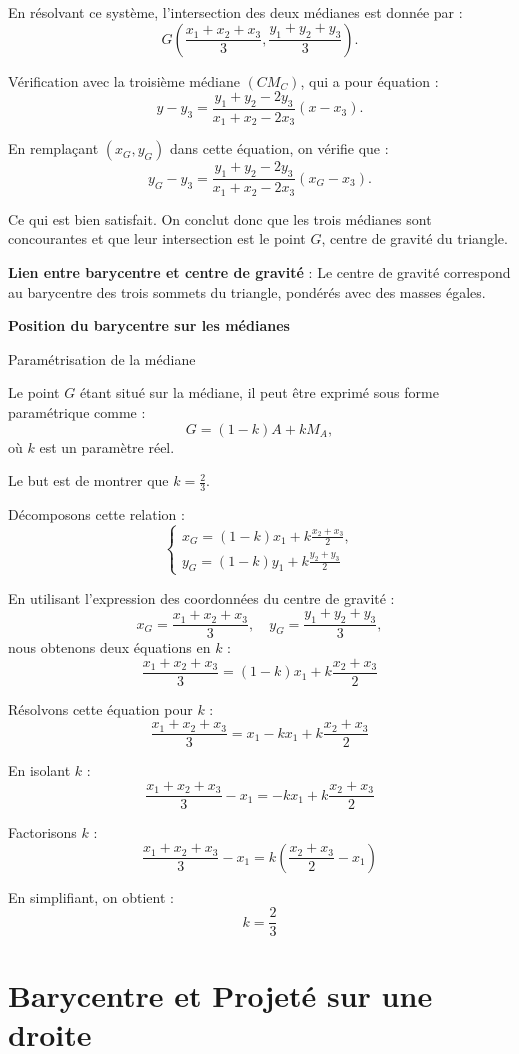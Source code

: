 \documentclass[10pt,a4paper]{article}
\begin{document}
En résolvant ce système, l'intersection des deux médianes est donnée par :
\[
G \left( \frac{x_1 + x_2 + x_3}{3}, \frac{y_1 + y_2 + y_3}{3} \right).
\]

Vérification avec la troisième médiane \((CM_C)\), qui a pour équation :
\[
y - y_3 = \frac{y_1 + y_2 - 2y_3}{x_1 + x_2 - 2x_3} (x - x_3).
\]

En remplaçant \((x_G, y_G)\) dans cette équation, on vérifie que :
\[
y_G - y_3 = \frac{y_1 + y_2 - 2y_3}{x_1 + x_2 - 2x_3} (x_G - x_3).
\]

Ce qui est bien satisfait. On conclut donc que les trois médianes sont concourantes et que leur
intersection est le point \( G \), centre de gravité du triangle.

\q \textbf{Lien entre barycentre et centre de gravité} : Le centre de gravité correspond au
barycentre des trois sommets du triangle, pondérés avec des masses égales.

\q \textbf{Position du barycentre sur les médianes}

Paramétrisation de la médiane

Le point \( G \) étant situé sur la médiane, il peut être exprimé sous forme paramétrique comme :
\[
G = (1 - k) A + k M_A,
\]
où \( k \) est un paramètre réel.

Le but est de montrer que \( k = \frac{2}{3} \).

Décomposons cette relation :
\[
\begin{cases}
x_G = (1 - k) x_1 + k \frac{x_2 + x_3}{2}, \\
y_G = (1 - k) y_1 + k \frac{y_2 + y_3}{2}
\end{cases}
\]

En utilisant l'expression des coordonnées du centre de gravité :
\[
x_G = \frac{x_1 + x_2 + x_3}{3}, \quad
y_G = \frac{y_1 + y_2 + y_3}{3},
\]
nous obtenons deux équations en \( k \) :
\[
\frac{x_1 + x_2 + x_3}{3} = (1 - k) x_1 + k \frac{x_2 + x_3}{2}
\]

Résolvons cette équation pour \( k \) :
\[
\frac{x_1 + x_2 + x_3}{3} = x_1 - k x_1 + k \frac{x_2 + x_3}{2}
\]

En isolant \( k \) :
\[
\frac{x_1 + x_2 + x_3}{3} - x_1 = -k x_1 + k \frac{x_2 + x_3}{2}
\]

Factorisons \( k \) :
\[
\frac{x_1 + x_2 + x_3}{3} - x_1 = k \left( \frac{x_2 + x_3}{2} - x_1 \right)
\]

En simplifiant, on obtient :
\[
k = \frac{2}{3}
\]


\section{Barycentre et Projeté sur une droite}
\end{document}
